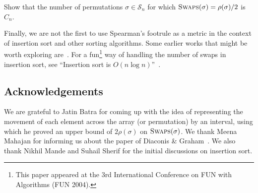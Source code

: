 \documentclass[12pt]{article}
\begin{document}
    \vspace{0.3cm}
    \begin{mdframed}[backgroundcolor=blue!5]
	\begin{itshape} Show that the number of permutations $\sigma\in\mathcal{S}_n$ for which $\displaystyle{\textsc{Swaps}(\sigma)=\rho(\sigma)/2}$ is $C_n$.
	\end{itshape}
	\end{mdframed}
    \vspace{0.3cm}
    
    Finally, we are not the first to use Spearman's footrule as a metric in the context of insertion sort and other sorting algorithms. Some earlier works that might be worth exploring are~\cite{spin1,spin2,spin3,spin4}. For a fun\footnote{This paper appeared at the 3rd International Conference on FUN with Algorithms (FUN 2004).} way of handling the number of swaps in insertion sort, see ``Insertion sort is $O(n \log n)$''~\cite{bender2006}.
    
    \subsection*{Acknowledgements} We are grateful to Jatin Batra for coming up with the idea of representing the movement of each element across the array (or permutation) by an interval, using which he proved an upper bound of $2\rho(\sigma)$ on $\textsc{Swaps}(\sigma)$. We thank Meena Mahajan for informing us about the paper of Diaconis \& Graham~\cite{diaconisgraham1977}. We also thank Nikhil Mande and Suhail Sherif for the initial discussions on insertion sort.
	
	
	
\end{document}
